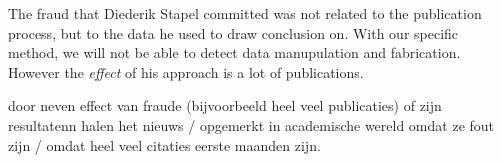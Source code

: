 \documentclass{ou-report}
\newcommand{\todo}[1]{{\color{red} TODO: #1}}
\newcommand{\outline}[1]{{\color{blue} #1}}
\begin{document}
The fraud that Diederik Stapel committed was not related to the publication 
process, but to the data he used to draw conclusion on.
With our specific method, we will not be able to detect data manupulation and
fabrication.
However the \textit{effect} of his approach is a lot of publications.

\outline{door neven effect van fraude (bijvoorbeeld heel veel publicaties) of 
zijn resultatenn halen het nieuws / opgemerkt in academische wereld omdat ze 
fout zijn / omdat heel veel citaties eerste maanden zijn}.





\end{document}
